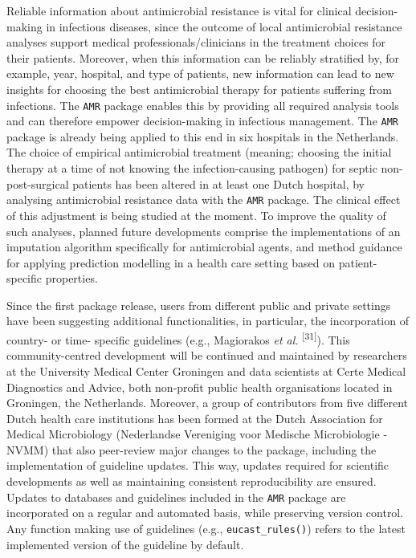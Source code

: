 \documentclass[
]{book}
\begin{document}
Reliable information about antimicrobial resistance is vital for clinical decision-making in infectious diseases, since the outcome of local antimicrobial resistance analyses support medical professionals/clinicians in the treatment choices for their patients. Moreover, when this information can be reliably stratified by, for example, year, hospital, and type of patients, new information can lead to new insights for choosing the best antimicrobial therapy for patients suffering from infections. The \texttt{AMR} package enables this by providing all required analysis tools and can therefore empower decision-making in infectious management. The \texttt{AMR} package is already being applied to this end in six hospitals in the Netherlands. The choice of empirical antimicrobial treatment (meaning; choosing the initial therapy at a time of not knowing the infection-causing pathogen) for septic non-post-surgical patients has been altered in at least one Dutch hospital, by analysing antimicrobial resistance data with the \texttt{AMR} package. The clinical effect of this adjustment is being studied at the moment. To improve the quality of such analyses, planned future developments comprise the implementations of an imputation algorithm specifically for antimicrobial agents, and method guidance for applying prediction modelling in a health care setting based on patient-specific properties.

Since the first package release, users from different public and private settings have been suggesting additional functionalities, in particular, the incorporation of country- or time- specific guidelines (e.g., Magiorakos \emph{et al.} \textsuperscript{{[}31{]}}). This community-centred development will be continued and maintained by researchers at the University Medical Center Groningen and data scientists at Certe Medical Diagnostics and Advice, both non-profit public health organisations located in Groningen, the Netherlands. Moreover, a group of contributors from five different Dutch health care institutions has been formed at the Dutch Association for Medical Microbiology (Nederlandse Vereniging voor Medische Microbiologie - NVMM) that also peer-review major changes to the package, including the implementation of guideline updates. This way, updates required for scientific developments as well as maintaining consistent reproducibility are ensured. Updates to databases and guidelines included in the \texttt{AMR} package are incorporated on a regular and automated basis, while preserving version control. Any function making use of guidelines (e.g., \texttt{eucast\_rules()}) refers to the latest implemented version of the guideline by default.
\end{document}
